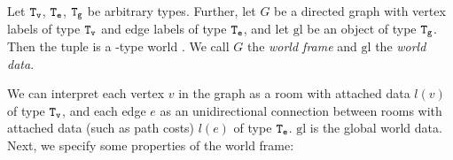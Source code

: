 \begin{definition}\label{def:wext}
	Let $\mathtt{T_v}$, $\mathtt{T_e}$, $\mathtt{T_g}$ be arbitrary types. Further, let $G$ be a directed graph with vertex labels of type $\mathtt{T_v}$ and edge labels of type $\mathtt{T_e}$, and let $\mathrm{gl}$ be an object of type $\mathtt{T_g}$. Then the tuple  is a \wext-type world . We call $G$ the {\em world frame} and $\mathrm{gl}$ the {\em world data}.
\end{definition}

We can interpret each vertex $v$ in the graph as a room with attached data $l(v)$ of type $\mathtt{T_v}$, and each edge $e$ as an unidirectional connection between rooms with attached data (such as path costs) $l(e)$ of type $\mathtt{T_e}$. $\mathrm{gl}$ is the global world data. Next, we specify some properties of the world frame:

